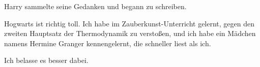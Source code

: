 Harry sammelte seine Gedanken und begann zu schreiben.

\begin{writtenNote}

Hogwarts ist richtig toll. Ich habe im Zauberkunst-Unterricht gelernt, gegen den zweiten Hauptsatz der Thermodynamik zu verstoßen, und ich habe ein Mädchen namens Hermine Granger kennengelernt, die schneller liest als ich.

Ich belasse es besser dabei.

\end{writtenNote}

